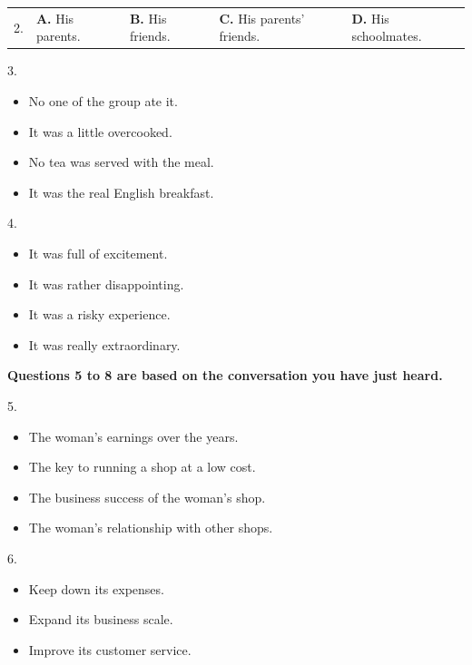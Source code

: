 \documentclass[UTF8,11pt]{ctexart}
\begin{document}
\noindent\begin{tabularx}{\linewidth}{@{}lXXXX@{}}2. & \textbf{A.} His parents. & \textbf{B.} His friends. & \textbf{C.} His parents' friends. & \textbf{D.} His schoolmates.\\\end{tabularx}\par

3.


\begin{itemize}[leftmargin=2em,itemsep=.2em,topsep=.4em]\item[A.] No one of the group ate it.
\item[B.] It was a little overcooked.
\item[C.] No tea was served with the meal.
\item[D.] It was the real English breakfast.
\end{itemize}

4.


\begin{itemize}[leftmargin=2em,itemsep=.2em,topsep=.4em]\item[A.] It was full of excitement.
\item[B.] It was rather disappointing.
\item[C.] It was a risky experience.
\item[D.] It was really extraordinary.
\end{itemize}

\textbf{Questions 5 to 8 are based on the conversation you have just heard.}


5.


\begin{itemize}[leftmargin=2em,itemsep=.2em,topsep=.4em]\item[A.] The woman's earnings over the years.
\item[B.] The key to running a shop at a low cost.
\item[C.] The business success of the woman's shop.
\item[D.] The woman's relationship with other shops.
\end{itemize}

6.


\begin{itemize}[leftmargin=2em,itemsep=.2em,topsep=.4em]\item[A.] Keep down its expenses.
\item[B.] Expand its business scale.
\item[C.] Improve its customer service.
\end{itemize}
\end{document}
